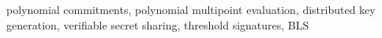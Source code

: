 \documentclass[conference]{IEEEtran}
\begin{document}

  
  
  
  \maketitle
  
  

  \maketitle %
  \begin{IEEEkeywords}
  polynomial commitments, polynomial multipoint evaluation, distributed key generation, verifiable secret sharing, threshold signatures, BLS
  \end{IEEEkeywords}
  
  
  
  
  
  
  
  
  
  

  \clearpage
  
   
  
  \appendix
  
  
  
  
  
\end{document}
